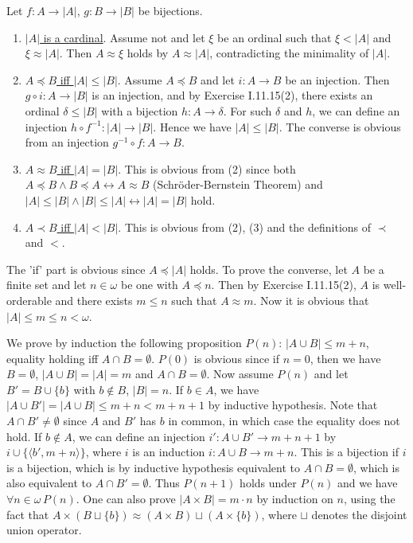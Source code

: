 \documentclass[12pt]{article}
\theoremstyle{definition}
\newenvironment{customthm}[1]
  {\renewcommand\theinnercustomthm{#1}\innercustomthm}
  {\endinnercustomthm}
\begin{document}
\begin{customthm}{I.11.23} Let $f:A\rightarrow|A|$, $g:B\rightarrow|B|$ be bijections.
\begin{enumerate}
\item \underline{$|A|$ is a cardinal}. Assume not and let $\xi$ be an ordinal such that $\xi<|A|$ and $\xi\approx|A|$. Then $A\approx\xi$ holds by $A\approx|A|$, contradicting the minimality of $|A|$.
\item \underline{$A\preccurlyeq B$ iff $|A|\leq|B|$}. Assume $A\preccurlyeq B$ and let $i:A\rightarrow B$ be an injection. Then $g\circ i:A\rightarrow|B|$ is an injection, and by Exercise I.11.15(2), there exists an ordinal $\delta\leq|B|$ with a bijection $h:A\rightarrow\delta$. For such $\delta$ and $h$, we can define an injection $h\circ f^{-1}:|A|\rightarrow|B|$. Hence we have $|A|\leq|B|$. The converse is obvious from an injection $g^{-1}\circ f:A\rightarrow B$.
\item \underline{$A\approx B$ iff $|A|=|B|$}. This is obvious from (2) since both $A\preccurlyeq B\wedge B\preccurlyeq A\leftrightarrow A\approx B$ (Schröder-Bernstein Theorem) and $|A|\leq|B|\wedge|B|\leq|A|\leftrightarrow|A|=|B|$ hold.
\item \underline{$A\prec B$ iff $|A|<|B|$}. This is obvious from (2), (3) and the definitions of $\prec$ and $<$.
\end{enumerate}
\end{customthm}

\begin{customthm}{I.11.24} The 'if' part is obvious since $A\preccurlyeq|A|$ holds. To prove the converse, let $A$ be a finite set and let $n\in\omega$ be one with $A\preccurlyeq n$. Then by Exercise I.11.15(2), $A$ is well-orderable and there exists $m\leq n$ such that $A\approx m$. Now it is obvious that $|A|\leq m\leq n<\omega$.
\end{customthm}

\begin{customthm}{I.11.25} We prove by induction the following proposition $P(n)$: $|A\cup B|\leq m+n$, equality holding iff $A\cap B=\emptyset$. $P(0)$ is obvious since if $n=0$, then we have $B=\emptyset$, $|A\cup B|=|A|=m$ and $A\cap B=\emptyset$. Now assume $P(n)$ and let $B'=B\cup\{b\}$ with $b\not\in B$, $|B|=n$. If $b\in A$, we have $|A\cup B'|=|A\cup B|\leq m+n<m+n+1$ by inductive hypothesis. Note that $A\cap B'\neq\emptyset$ since $A$ and $B'$ has $b$ in common, in which case the equality does not hold. If $b\not\in A$, we can define an injection $i':A\cup B'\rightarrow m+n+1$ by $i\cup\{\langle b',m+n\rangle\}$, where $i$ is an induction $i:A\cup B\rightarrow m+n$. This is a bijection if $i$ is a bijection, which is by inductive hypothesis equivalent to $A\cap B=\emptyset$, which is also equivalent to $A\cap B'=\emptyset$. Thus $P(n+1)$ holds under $P(n)$ and we have $\forall n\in\omega\,P(n)$. One can also prove $|A\times B|=m\cdot n$ by induction on $n$, using the fact that $A\times (B\sqcup\{b\})\approx(A\times B)\sqcup(A\times\{b\})$, where $\sqcup$ denotes the disjoint union operator.
\end{customthm}
\end{document}
